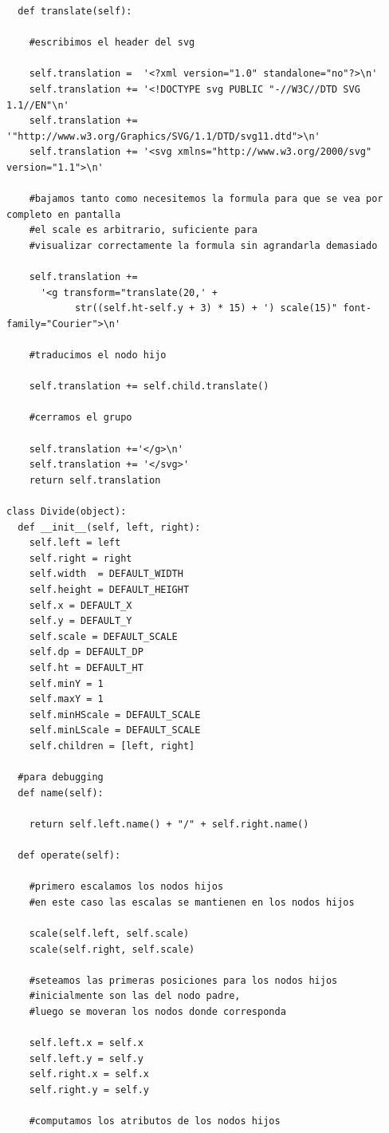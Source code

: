 \begin{verbatim}
  def translate(self):

    #escribimos el header del svg

    self.translation =  '<?xml version="1.0" standalone="no"?>\n'
    self.translation += '<!DOCTYPE svg PUBLIC "-//W3C//DTD SVG 1.1//EN"\n'
    self.translation += '"http://www.w3.org/Graphics/SVG/1.1/DTD/svg11.dtd">\n'
    self.translation += '<svg xmlns="http://www.w3.org/2000/svg" version="1.1">\n'

    #bajamos tanto como necesitemos la formula para que se vea por completo en pantalla
    #el scale es arbitrario, suficiente para 
    #visualizar correctamente la formula sin agrandarla demasiado

    self.translation +=
      '<g transform="translate(20,' + 
            str((self.ht-self.y + 3) * 15) + ') scale(15)" font-family="Courier">\n'
    
    #traducimos el nodo hijo

    self.translation += self.child.translate()

    #cerramos el grupo

    self.translation +='</g>\n'
    self.translation += '</svg>'
    return self.translation

class Divide(object):
  def __init__(self, left, right):
    self.left = left
    self.right = right
    self.width  = DEFAULT_WIDTH
    self.height = DEFAULT_HEIGHT
    self.x = DEFAULT_X
    self.y = DEFAULT_Y
    self.scale = DEFAULT_SCALE
    self.dp = DEFAULT_DP
    self.ht = DEFAULT_HT
    self.minY = 1
    self.maxY = 1
    self.minHScale = DEFAULT_SCALE
    self.minLScale = DEFAULT_SCALE
    self.children = [left, right]

  #para debugging
  def name(self):

    return self.left.name() + "/" + self.right.name()

  def operate(self):

    #primero escalamos los nodos hijos
    #en este caso las escalas se mantienen en los nodos hijos

    scale(self.left, self.scale)
    scale(self.right, self.scale)
    
    #seteamos las primeras posiciones para los nodos hijos
    #inicialmente son las del nodo padre,
    #luego se moveran los nodos donde corresponda

    self.left.x = self.x
    self.left.y = self.y 
    self.right.x = self.x
    self.right.y = self.y

    #computamos los atributos de los nodos hijos


\end{verbatim}
